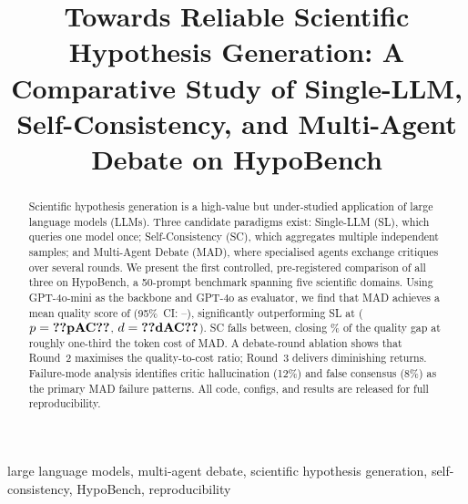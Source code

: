 \documentclass[conference]{IEEEtran}
\begin{document}
\title{Towards Reliable Scientific Hypothesis Generation: A Comparative Study of Single-LLM, Self-Consistency, and Multi-Agent Debate on HypoBench}

\author{%
}

\maketitle

\begin{abstract}
Scientific hypothesis generation is a high-value but under-studied application
of large language models (LLMs).  Three candidate paradigms exist: Single-LLM
(SL), which queries one model once; Self-Consistency (SC), which aggregates
multiple independent samples; and Multi-Agent Debate (MAD), where specialised
agents exchange critiques over several rounds.  We present the first controlled,
pre-registered comparison of all three on HypoBench, a 50-prompt benchmark
spanning five scientific domains.  Using GPT-4o-mini as the backbone and GPT-4o
as evaluator, we find that MAD achieves a mean quality score of 
(95\%~CI: --), significantly outperforming SL at 
($p=\N{pAC}$, $d=\N{dAC}$).  SC falls between, closing \% of the
quality gap at roughly one-third the token cost of MAD.  A debate-round ablation
shows that Round~2 maximises the quality-to-cost ratio; Round~3 delivers
diminishing returns.  Failure-mode analysis identifies critic hallucination (12\%)
and false consensus (8\%) as the primary MAD failure patterns.  All code,
configs, and results are released for full reproducibility.
\end{abstract}

\begin{IEEEkeywords}
large language models, multi-agent debate, scientific hypothesis generation,
self-consistency, HypoBench, reproducibility
\end{IEEEkeywords}





\end{document}
